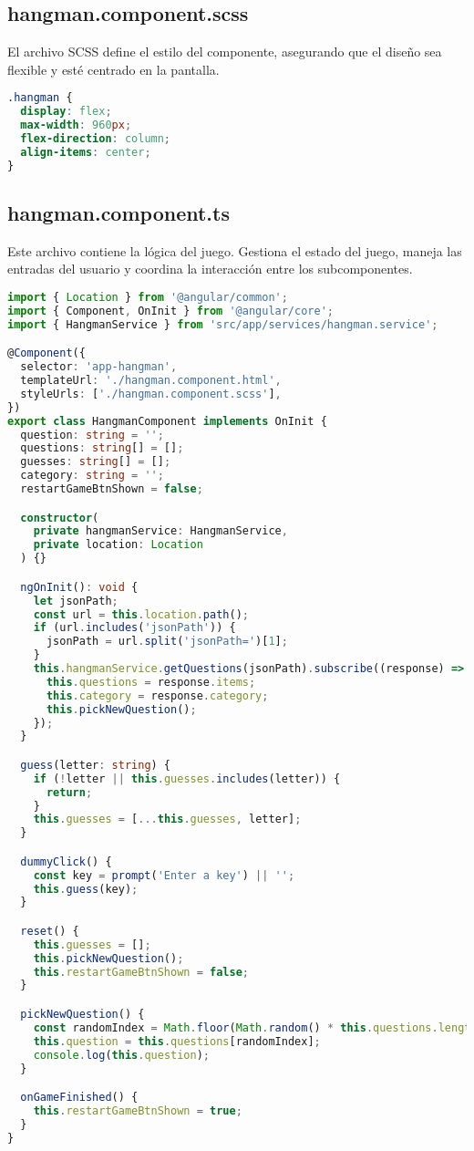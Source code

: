 \subsection{hangman.component.scss}

El archivo SCSS define el estilo del componente, asegurando que el diseño sea flexible y esté centrado en la pantalla.

\begin{lstlisting}[language=CSS]
.hangman {
  display: flex;
  max-width: 960px;
  flex-direction: column;
  align-items: center;
}
\end{lstlisting}

\subsection{hangman.component.ts}

Este archivo contiene la lógica del juego. Gestiona el estado del juego, maneja las entradas del usuario y coordina la interacción entre los subcomponentes.

\begin{lstlisting}[language=TypeScript]
import { Location } from '@angular/common';
import { Component, OnInit } from '@angular/core';
import { HangmanService } from 'src/app/services/hangman.service';

@Component({
  selector: 'app-hangman',
  templateUrl: './hangman.component.html',
  styleUrls: ['./hangman.component.scss'],
})
export class HangmanComponent implements OnInit {
  question: string = '';
  questions: string[] = [];
  guesses: string[] = [];
  category: string = '';
  restartGameBtnShown = false;

  constructor(
    private hangmanService: HangmanService,
    private location: Location
  ) {}

  ngOnInit(): void {
    let jsonPath;
    const url = this.location.path();
    if (url.includes('jsonPath')) {
      jsonPath = url.split('jsonPath=')[1];
    }
    this.hangmanService.getQuestions(jsonPath).subscribe((response) => {
      this.questions = response.items;
      this.category = response.category;
      this.pickNewQuestion();
    });
  }

  guess(letter: string) {
    if (!letter || this.guesses.includes(letter)) {
      return;
    }
    this.guesses = [...this.guesses, letter];
  }

  dummyClick() {
    const key = prompt('Enter a key') || '';
    this.guess(key);
  }

  reset() {
    this.guesses = [];
    this.pickNewQuestion();
    this.restartGameBtnShown = false;
  }

  pickNewQuestion() {
    const randomIndex = Math.floor(Math.random() * this.questions.length);
    this.question = this.questions[randomIndex];
    console.log(this.question);
  }

  onGameFinished() {
    this.restartGameBtnShown = true;
  }
}
\end{lstlisting}

